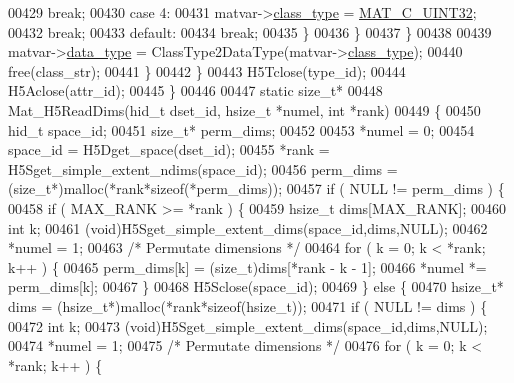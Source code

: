 \begin{DoxyCode}
00429                             \textcolor{keywordflow}{break};
00430                         \textcolor{keywordflow}{case} 4:
00431                             matvar->\hyperlink{group___m_a_t_aff13035bf3265dd7d9425e5d40c839d4}{class\_type} = \hyperlink{group___m_a_t_ggad4d60ae7b709fc81bfd744fb4c857c40a9a17a7edd45b19ef68197db81b27e816}{MAT\_C\_UINT32};
00432                             \textcolor{keywordflow}{break};
00433                         \textcolor{keywordflow}{default}:
00434                             \textcolor{keywordflow}{break};
00435                     \}
00436                 \}
00437             \}
00438 
00439             matvar->\hyperlink{group___m_a_t_ab6aafe9bd77f0f077852593dec438144}{data\_type} = ClassType2DataType(matvar->\hyperlink{group___m_a_t_aff13035bf3265dd7d9425e5d40c839d4}{class\_type});
00440             free(class\_str);
00441         \}
00442     \}
00443     H5Tclose(type\_id);
00444     H5Aclose(attr\_id);
00445 \}
00446 
00447 \textcolor{keyword}{static} \textcolor{keywordtype}{size\_t}*
00448 Mat\_H5ReadDims(hid\_t dset\_id, hsize\_t *numel, \textcolor{keywordtype}{int} *rank)
00449 \{
00450     hid\_t space\_id;
00451     \textcolor{keywordtype}{size\_t}* perm\_dims;
00452 
00453     *numel = 0;
00454     space\_id = H5Dget\_space(dset\_id);
00455     *rank = H5Sget\_simple\_extent\_ndims(space\_id);
00456     perm\_dims = (\textcolor{keywordtype}{size\_t}*)malloc(*rank*\textcolor{keyword}{sizeof}(*perm\_dims));
00457     \textcolor{keywordflow}{if} ( NULL != perm\_dims ) \{
00458         \textcolor{keywordflow}{if} ( MAX\_RANK >= *rank ) \{
00459             hsize\_t dims[MAX\_RANK];
00460             \textcolor{keywordtype}{int} k;
00461             (void)H5Sget\_simple\_extent\_dims(space\_id,dims,NULL);
00462             *numel = 1;
00463             \textcolor{comment}{/* Permutate dimensions */}
00464             \textcolor{keywordflow}{for} ( k = 0; k < *rank; k++ ) \{
00465                 perm\_dims[k] = (size\_t)dims[*rank - k - 1];
00466                 *numel *= perm\_dims[k];
00467             \}
00468             H5Sclose(space\_id);
00469         \} \textcolor{keywordflow}{else} \{
00470             hsize\_t* dims = (hsize\_t*)malloc(*rank*\textcolor{keyword}{sizeof}(hsize\_t));
00471             \textcolor{keywordflow}{if} ( NULL != dims ) \{
00472                 \textcolor{keywordtype}{int} k;
00473                 (void)H5Sget\_simple\_extent\_dims(space\_id,dims,NULL);
00474                 *numel = 1;
00475                 \textcolor{comment}{/* Permutate dimensions */}
00476                 \textcolor{keywordflow}{for} ( k = 0; k < *rank; k++ ) \{

\end{DoxyCode}
